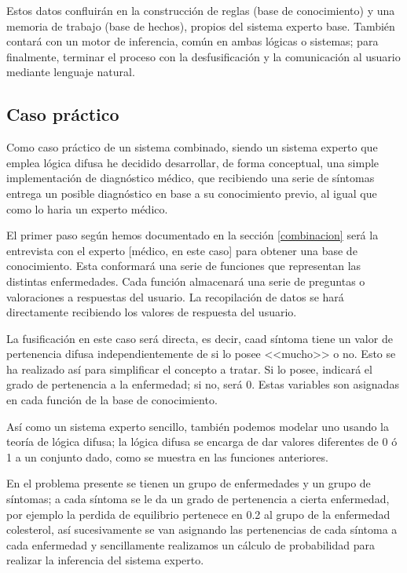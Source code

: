 \documentclass[a4paper, 11pt, titlepage]{article}
\begin{document}
    Estos datos confluirán en la construcción de reglas (base de conocimiento) y una memoria de trabajo 
    (base de hechos), propios del sistema experto base. También contará con un motor de inferencia, común 
    en ambas lógicas o sistemas; para finalmente, terminar el proceso con la desfusificación y la comunicación 
    al usuario mediante lenguaje natural.
    
    \subsection{Caso práctico}\label{casopractico}

        Como caso práctico de un sistema combinado, siendo un sistema experto que emplea lógica difusa he 
        decidido desarrollar, de forma conceptual, una simple implementación de diagnóstico médico, que 
        recibiendo una serie de síntomas entrega un posible diagnóstico en base a su conocimiento previo, al igual 
        que como lo haria un experto médico.

        El primer paso según hemos documentado en la sección \ref{combinacion} será la entrevista con el 
        experto [médico, en este caso] para obtener una base de conocimiento. Esta conformará una serie de 
        funciones que representan las distintas enfermedades. Cada función almacenará una serie de preguntas 
        o valoraciones a respuestas del usuario. La recopilación de datos se hará directamente recibiendo los 
        valores de respuesta del usuario.

        La fusificación en este caso será directa, es decir, caad síntoma tiene un valor de pertenencia difusa
        independientemente de si lo posee <<mucho>> o no. Esto se ha realizado así para simplificar el concepto 
        a tratar. Si lo posee, indicará el grado de pertenencia a la enfermedad; si no, será 0. Estas variables 
        son asignadas en cada función de la base de conocimiento.

        Así como un sistema experto sencillo, también podemos modelar uno usando la teoría de lógica difusa; 
        la lógica difusa se encarga de dar valores diferentes de 0 ó 1 a un conjunto dado, como se muestra 
        en las funciones anteriores.

        En el problema presente se tienen un grupo de enfermedades y un grupo de síntomas; a cada síntoma 
        se le da un grado de pertenencia a cierta enfermedad, por ejemplo la perdida de equilibrio pertenece 
        en 0.2 al grupo de la enfermedad colesterol, así sucesivamente se van asignando las pertenencias de
        cada síntoma a cada enfermedad y sencillamente realizamos un cálculo de probabilidad para realizar 
        la inferencia del sistema experto.
\end{document}

